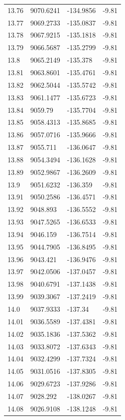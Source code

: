 \begin{table}[H]
\begin{tabular}{llll}
13.76 & 9070.6241 & -134.9856 & -9.81 \\
13.77 & 9069.2733 & -135.0837 & -9.81 \\
13.78 & 9067.9215 & -135.1818 & -9.81 \\
13.79 & 9066.5687 & -135.2799 & -9.81 \\
13.8 & 9065.2149 & -135.378 & -9.81 \\
13.81 & 9063.8601 & -135.4761 & -9.81 \\
13.82 & 9062.5044 & -135.5742 & -9.81 \\
13.83 & 9061.1477 & -135.6723 & -9.81 \\
13.84 & 9059.79 & -135.7704 & -9.81 \\
13.85 & 9058.4313 & -135.8685 & -9.81 \\
13.86 & 9057.0716 & -135.9666 & -9.81 \\
13.87 & 9055.711 & -136.0647 & -9.81 \\
13.88 & 9054.3494 & -136.1628 & -9.81 \\
13.89 & 9052.9867 & -136.2609 & -9.81 \\
13.9 & 9051.6232 & -136.359 & -9.81 \\
13.91 & 9050.2586 & -136.4571 & -9.81 \\
13.92 & 9048.893 & -136.5552 & -9.81 \\
13.93 & 9047.5265 & -136.6533 & -9.81 \\
13.94 & 9046.159 & -136.7514 & -9.81 \\
13.95 & 9044.7905 & -136.8495 & -9.81 \\
13.96 & 9043.421 & -136.9476 & -9.81 \\
13.97 & 9042.0506 & -137.0457 & -9.81 \\
13.98 & 9040.6791 & -137.1438 & -9.81 \\
13.99 & 9039.3067 & -137.2419 & -9.81 \\
14.0 & 9037.9333 & -137.34 & -9.81 \\
14.01 & 9036.5589 & -137.4381 & -9.81 \\
14.02 & 9035.1836 & -137.5362 & -9.81 \\
14.03 & 9033.8072 & -137.6343 & -9.81 \\
14.04 & 9032.4299 & -137.7324 & -9.81 \\
14.05 & 9031.0516 & -137.8305 & -9.81 \\
14.06 & 9029.6723 & -137.9286 & -9.81 \\
14.07 & 9028.292 & -138.0267 & -9.81 \\
14.08 & 9026.9108 & -138.1248 & -9.81 \\

\end{tabular}
\end{table}

